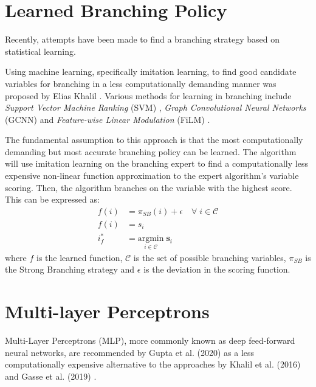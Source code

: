 \section{Learned Branching Policy}

Recently, attempts have been made to find a branching strategy based on statistical learning. 

Using machine learning, specifically imitation learning, to find good candidate variables for branching in a less computationally demanding manner was proposed by Elias Khalil \cite{khalil2016learning}. Various methods for learning in branching include \textit{ Support Vector Machine Ranking} (\Gls{SVM}) \cite{khalil2016learning}, \textit{Graph Convolutional Neural Networks} (\gls{GCNN}) \cite{gasse2019exact} and \textit{Feature-wise Linear Modulation} (\gls{FiLM}) \cite{gupta2020hybrid}.

The fundamental assumption to this approach is that the most computationally demanding but most accurate branching policy can be learned. The algorithm will use imitation learning on the branching expert to find a computationally less expensive non-linear function approximation to the expert algorithm's variable scoring. Then, the algorithm branches on the variable with the highest score. This can be expressed as: 
\begin{align}
    f(i) &=  \pi_{SB} (i) + \epsilon \quad \forall \; i \in \mathcal{C}\\
    f(i) &= s_i\\
    i^*_f &= \underset{i \in \mathcal{C}}{\mathrm{argmin}} \; \bm{s}_i
\end{align}
where $f$ is the learned function, $\mathcal{C}$ is the set of possible branching variables, $\pi_{SB}$ is the Strong Branching strategy and $\epsilon$ is the deviation in the scoring function. 


\section{Multi-layer Perceptrons}

Multi-Layer Perceptrons (MLP), more commonly known as deep feed-forward neural networks, are recommended by Gupta et al. (2020) \cite{gupta2020hybrid} as a less computationally expensive alternative to the approaches by Khalil et al. (2016) \cite{khalil2016learning} and Gasse et al. (2019) \cite{gasse2019exact}. 


